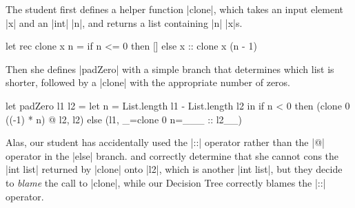 The student first defines a helper function |clone|, which takes an
input element |x| and an |int| |n|, and returns a list containing |n|
|x|s.
%
\begin{ecode}
  let rec clone x n =
    if n <= 0 then
      []
    else
      x :: clone x (n - 1)
\end{ecode}
%
Then she defines |padZero| with a simple branch that determines which
list is shorter, followed by a |clone| with the appropriate number of
zeros.
%
\lstset{firstnumber=last}
\begin{ecode}
  let padZero l1 l2 =
    let n = List.length l1 - List.length l2 in
    if n < 0 then
      (clone 0 ((-1) * n) @ l2, l2)
    else
      (l1, _=clone 0 n=___ :: l2__)
\end{ecode}
\lstset{firstnumber=1}
%
Alas, our student has accidentally used the |::| operator rather than
the |@| operator in the |else| branch.
%
\sherrloc and \ocaml correctly determine that she cannot cons the
|int list| returned by |clone| onto |l2|, which is another |int list|,
but they decide to \emph{blame} the call to |clone|, while our Decision
Tree correctly blames the |::| operator.
%





